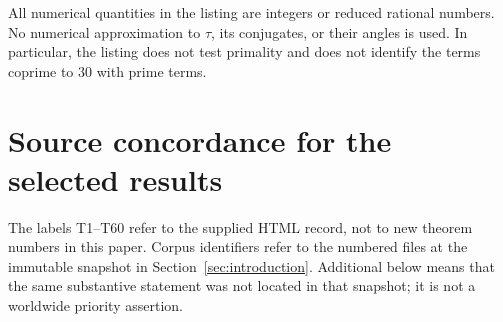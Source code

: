 \documentclass[11pt,a4paper]{article}
\theoremstyle{definition}\newtheorem{definition}[theorem]{Definition}
\theoremstyle{remark}\newtheorem{remark}[theorem]{Remark}
\begin{document}
All numerical quantities in the listing are integers or reduced rational
numbers.  No numerical approximation to $\tau$, its conjugates, or their
angles is used.  In particular, the listing does not test primality and
does not identify the terms coprime to $30$ with prime terms.

\clearpage

\section{Source concordance for the selected results}\label{app:sources}
The labels T1--T60 refer to the supplied HTML record, not to new
theorem numbers in this paper. Corpus identifiers refer to the numbered
files at the immutable snapshot in Section~\ref{sec:introduction}.
Additional below means that the same substantive statement was not
located in that snapshot; it is not a worldwide priority assertion.
\end{document}
